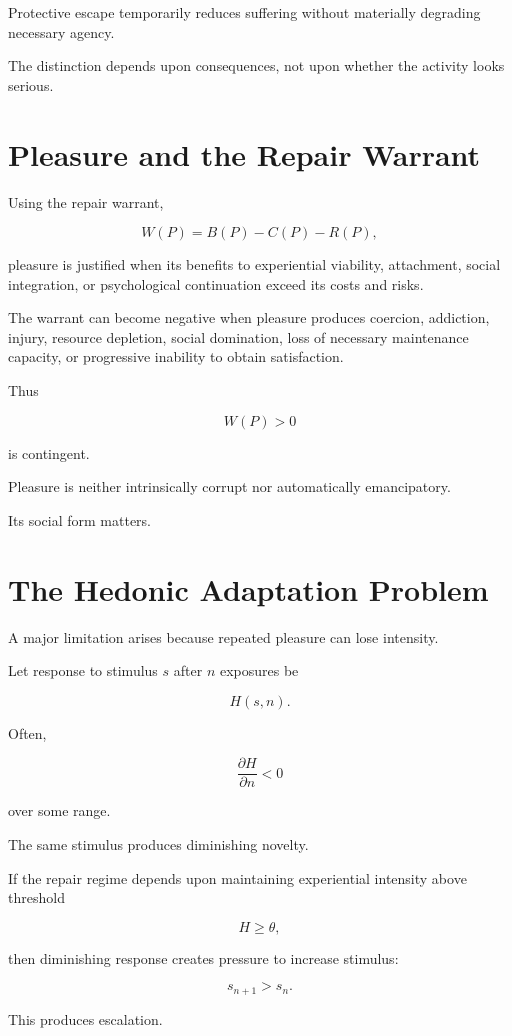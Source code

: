 \documentclass[11pt,oneside]{book}
\theoremstyle{definition}
\theoremstyle{remark}
\begin{document}
Protective escape temporarily reduces suffering without materially degrading necessary agency.

The distinction depends upon consequences, not upon whether the activity looks serious.

\section{Pleasure and the Repair Warrant}

Using the repair warrant,

\[
W(P)
=
B(P)-C(P)-R(P),
\]

pleasure is justified when its benefits to experiential viability, attachment, social integration, or psychological continuation exceed its costs and risks.

The warrant can become negative when pleasure produces coercion, addiction, injury, resource depletion, social domination, loss of necessary maintenance capacity, or progressive inability to obtain satisfaction.

Thus

\[
W(P)>0
\]

is contingent.

Pleasure is neither intrinsically corrupt nor automatically emancipatory.

Its social form matters.

\section{The Hedonic Adaptation Problem}

A major limitation arises because repeated pleasure can lose intensity.

Let response to stimulus \(s\) after \(n\) exposures be

\[
H(s,n).
\]

Often,

\[
\frac{\partial H}{\partial n}<0
\]

over some range.

The same stimulus produces diminishing novelty.

If the repair regime depends upon maintaining experiential intensity above threshold

\[
H\geq\theta,
\]

then diminishing response creates pressure to increase stimulus:

\[
s_{n+1}>s_n.
\]

This produces escalation.
\end{document}
